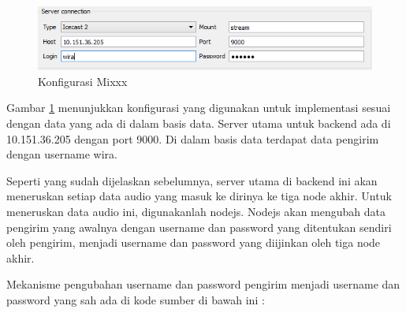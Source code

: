 \documentclass[oneside]{book}
\begin{document}
	\begin{figure}
		\centering
		\includegraphics[width=0.7\linewidth]{konfigMixxx}
		\caption{Konfigurasi Mixxx}
		\label{fig:konfigMixxx}
	\end{figure}
	
	Gambar \ref{fig:konfigMixxx} menunjukkan konfigurasi yang digunakan untuk implementasi sesuai dengan data yang ada di dalam basis data. Server utama untuk backend ada di 10.151.36.205 dengan port 9000. Di dalam basis data terdapat data pengirim dengan username wira.
	
	Seperti yang sudah dijelaskan sebelumnya, server utama di backend ini akan meneruskan setiap data audio yang masuk ke dirinya ke tiga node akhir. Untuk meneruskan data audio ini, digunakanlah nodejs. Nodejs akan mengubah data pengirim yang awalnya dengan username dan password yang ditentukan sendiri oleh pengirim, menjadi username dan password yang diijinkan oleh tiga node akhir.
	
	Mekanisme pengubahan username dan password pengirim menjadi username dan password yang sah ada di kode sumber di bawah ini :
	
\end{document}
